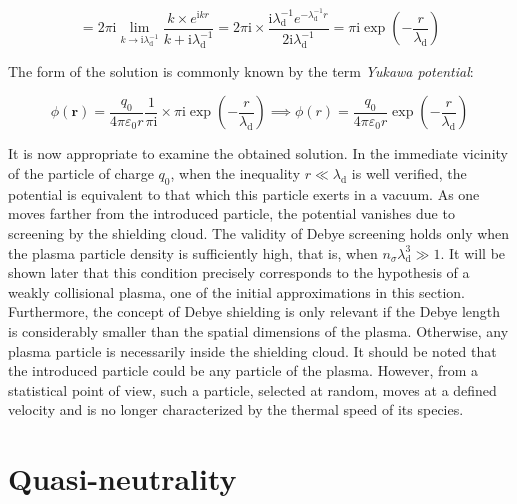 \begin{equation}
    =2\pi\mathrm{i}\lim_{k\to\mathrm{i}\lambda_\mathrm{d}^{-1}}\frac{k\times e^{\mathrm{i}kr}}{k+\mathrm{i}\lambda_\mathrm{d}^{-1}}=2\pi\mathrm{i}\times\frac{\mathrm{i}\lambda_\mathrm{d}^{-1}e^{-\lambda_\mathrm{d}^{-1}r}}{2\mathrm{i}\lambda_\mathrm{d}^{-1}}=\pi \mathrm{i}\exp\left(-\frac{r}{\lambda_\mathrm{d}}\right)
\end{equation}

The form of the solution is commonly known by the term \textit{Yukawa potential}:

\begin{equation}
    \phi(\mathbf{r})=\frac{q_0}{4\pi\varepsilon_0r}\frac{1}{\pi\mathrm{i}}\times\pi\mathrm{i}\exp\left(-\frac{r}{\lambda_\mathrm{d}}\right)\implies \phi(r)=\frac{q_0}{4\pi\varepsilon_0r}\exp\left(-\frac{r}{\lambda_\mathrm{d}}\right)
\end{equation}

It is now appropriate to examine the obtained solution. In the immediate vicinity of the particle of charge $q_0$, when the inequality $r\ll\lambda_\mathrm{d}$ is well verified, the potential is equivalent to that which this particle exerts in a vacuum. As one moves farther from the introduced particle, the potential vanishes due to screening by the shielding cloud. The validity of Debye screening holds only when the plasma particle density is sufficiently high, that is, when $n_\sigma\lambda_\mathrm{d}^3\gg1$. It will be shown later that this condition precisely corresponds to the hypothesis of a weakly collisional plasma, one of the initial approximations in this section. Furthermore, the concept of Debye shielding is only relevant if the Debye length is considerably smaller than the spatial dimensions of the plasma. Otherwise, any plasma particle is necessarily inside the shielding cloud. It should be noted that the introduced particle could be any particle of the plasma. However, from a statistical point of view, such a particle, selected at random, moves at a defined velocity and is no longer characterized by the thermal speed of its species.

\section{Quasi-neutrality}

